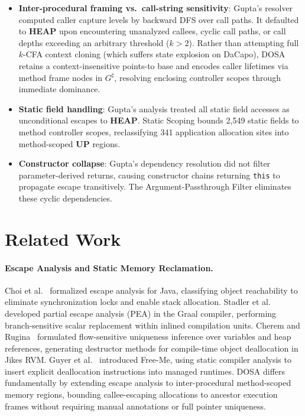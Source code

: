 \documentclass[12pt,a4paper]{article}
\newcommand{\UP}{\textbf{UP}}
\newcommand{\HEAP}{\textbf{HEAP}}
\begin{document}
\begin{itemize}
  \item \textbf{Inter-procedural framing vs.\ call-string sensitivity}: Gupta's resolver computed caller capture levels by backward DFS over call paths. It defaulted to \HEAP{} upon encountering unanalyzed callees, cyclic call paths, or call depths exceeding an arbitrary threshold ($k > 2$). Rather than attempting full $k$-CFA context cloning (which suffers state explosion on DaCapo), DOSA retains a context-insensitive points-to base and encodes caller lifetimes via method frame nodes in $G^\sharp$, resolving enclosing controller scopes through immediate dominance.
  \item \textbf{Static field handling}: Gupta's analysis treated all static field accesses as unconditional escapes to \HEAP{}. Static Scoping bounds 2{,}549 static fields to method controller scopes, reclassifying 341 application allocation sites into method-scoped \UP{} regions.
  \item \textbf{Constructor collapse}: Gupta's dependency resolution did not filter parameter-derived returns, causing constructor chains returning \texttt{this} to propagate escape transitively. The Argument-Passthrough Filter eliminates these cyclic dependencies.
\end{itemize}

\section{Related Work}
\label{sec:related}

\paragraph{Escape Analysis and Static Memory Reclamation.}
Choi et al.~\cite{choi1999escape} formalized escape analysis for Java, classifying object reachability to eliminate synchronization locks and enable stack allocation. Stadler et al.~\cite{stadler2014pea} developed partial escape analysis (PEA) in the Graal compiler, performing branch-sensitive scalar replacement within inlined compilation units. Cherem and Rugina~\cite{cherem2007} formulated flow-sensitive uniqueness inference over variables and heap references, generating destructor methods for compile-time object deallocation in Jikes RVM. Guyer et al.~\cite{guyer2006freeme} introduced Free-Me, using static compiler analysis to insert explicit deallocation instructions into managed runtimes. DOSA differs fundamentally by extending escape analysis to inter-procedural method-scoped memory regions, bounding callee-escaping allocations to ancestor execution frames without requiring manual annotations or full pointer uniqueness.
\end{document}
